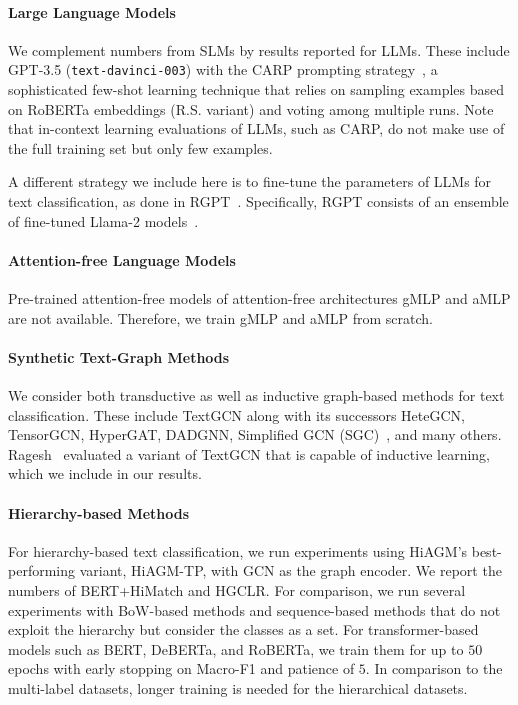 \documentclass[acmsmall,nonacm]{acmart}
\newcommand{\SLMs}{SLMs\xspace}
\newcommand{\LLMs}{LLMs\xspace}
\begin{document}
\paragraph{Large Language Models}
We complement numbers from \SLMs by results reported for \LLMs.
These include GPT-3.5 (\texttt{text-davinci-003}) with the CARP prompting strategy~\cite{carp}, a sophisticated few-shot learning technique that relies on sampling examples based on RoBERTa embeddings (R.S. variant) and voting among multiple runs. 
Note that in-context learning evaluations of LLMs, such as CARP, do not make use of the full training set but only few examples. 

A different strategy we include here is to fine-tune the parameters of LLMs for text classification, as done in RGPT~\cite{DBLP:journals/corr/abs-2402-07470-pushing-the-limit}. Specifically, RGPT consists of an ensemble of fine-tuned Llama-2 models~\cite{touvronLlamaOpenFoundation2023}.

\paragraph{Attention-free Language Models}
Pre-trained attention-free models of attention-free architectures gMLP and aMLP are not available. Therefore, we train gMLP and aMLP from scratch.

\paragraph{Synthetic Text-Graph Methods}

We consider both transductive as well as inductive graph-based methods for text classification.
These include TextGCN along with its successors HeteGCN, TensorGCN, HyperGAT,
DADGNN, Simplified GCN (SGC)~\cite{DBLP:conf/icml/WuSZFYW19}, and many others.
Ragesh~\etal\cite{DBLP:conf/wsdm/RageshSIBL21} evaluated a variant of TextGCN that is capable of inductive learning, which we include in our results. 

\paragraph{Hierarchy-based Methods}
\label{sec:hiagm}
\label{sec:Hierarchy-based-Text-Classification}
For hierarchy-based text classification, we run experiments using HiAGM's best-performing variant, HiAGM-TP, with GCN as the graph encoder.
We report the numbers of BERT+HiMatch and HGCLR.
For comparison, we run several experiments with BoW-based methods and sequence-based methods that do not exploit the hierarchy but consider the classes as a set.
For transformer-based models such as BERT, DeBERTa, and RoBERTa, we train them for up to $50$ epochs with early stopping on Macro-F1 and patience of $5$.
In comparison to the multi-label datasets, longer training is needed for the hierarchical datasets.
\end{document}
